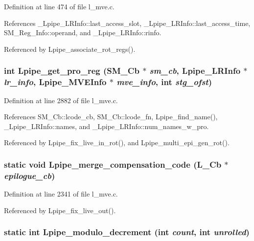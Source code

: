 Definition at line 474 of file l\_\-mve.c.

References \_\-Lpipe\_\-LRInfo::last\_\-access\_\-slot, \_\-Lpipe\_\-LRInfo::last\_\-access\_\-time, SM\_\-Reg\_\-Info::operand, and \_\-Lpipe\_\-LRInfo::rinfo.

Referenced by Lpipe\_\-associate\_\-rot\_\-regs().
\subsubsection{\setlength{\rightskip}{0pt plus 5cm}int Lpipe\_\-get\_\-pro\_\-reg (\bf{SM\_\-Cb} $\ast$ {\em sm\_\-cb}, \bf{Lpipe\_\-LRInfo} $\ast$ {\em lr\_\-info}, \bf{Lpipe\_\-MVEInfo} $\ast$ {\em mve\_\-info}, int {\em stg\_\-ofst})}\label{l__mve_8c_bc251ae063227ad587bde4091a7a8a7a}




Definition at line 2882 of file l\_\-mve.c.

References SM\_\-Cb::lcode\_\-cb, SM\_\-Cb::lcode\_\-fn, Lpipe\_\-find\_\-name(), \_\-Lpipe\_\-LRInfo::names, and \_\-Lpipe\_\-LRInfo::num\_\-names\_\-w\_\-pro.

Referenced by Lpipe\_\-fix\_\-live\_\-in\_\-rot(), and Lpipe\_\-multi\_\-epi\_\-gen\_\-rot().
\subsubsection{\setlength{\rightskip}{0pt plus 5cm}static void Lpipe\_\-merge\_\-compensation\_\-code (L\_\-Cb $\ast$ {\em epilogue\_\-cb})\hspace{0.3cm}{\tt  [static]}}\label{l__mve_8c_300fcb8a4b5a8a4fc7f52e0b8c193f91}




Definition at line 2341 of file l\_\-mve.c.

Referenced by Lpipe\_\-fix\_\-live\_\-out().
\subsubsection{\setlength{\rightskip}{0pt plus 5cm}static int Lpipe\_\-modulo\_\-decrement (int {\em count}, int {\em unrolled})\hspace{0.3cm}{\tt  [static]}}\label{l__mve_8c_7dd82e8867f2fca8e451a4c7be59fd17}




